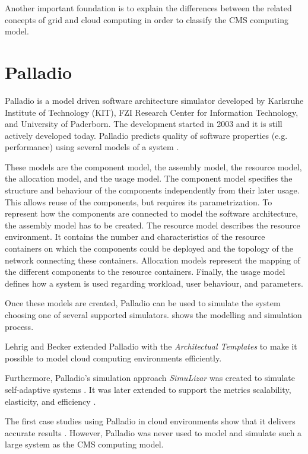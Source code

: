 Another important foundation is to explain the differences between the related concepts of grid and cloud computing in order to classify the CMS computing model.

\section{Palladio}
\label{palladio}
Palladio is a model driven software architecture simulator developed by Karlsruhe Institute of Technology (KIT), FZI Research Center for Information Technology, and University of Paderborn. The development started in 2003 and it is still actively developed today. Palladio predicts quality of software properties (e.g. performance) using several models of a system \cite{BECKER20093}.

These models are the component model, the assembly model, the resource model, the allocation model, and the usage model.
The component model specifies the structure and behaviour of the components independently from their later usage. This allows reuse of the components,  but requires its parametrization.
To represent how the components are connected to model the software architecture, the assembly model has to be created. 
The resource model describes the resource environment. It contains the number and characteristics of the resource containers on which the components could be deployed and the topology of the network connecting these containers.
Allocation models represent the mapping of the different components to the resource containers.
Finally, the usage model defines how a system is used regarding workload, user behaviour, and parameters.

Once these models are created, Palladio can be used to simulate the system choosing one of several supported simulators.  shows the modelling and simulation process. 

Lehrig and Becker \cite{arch} extended Palladio with the \textit{Architectual Templates} to make it possible to model cloud computing environments efficiently.

Furthermore, Palladio's simulation approach \textit{SimuLizar} was created to simulate self-adaptive systems \cite{becker2013simulizar}.
It was later extended to support the metrics scalability, elasticity, and efficiency \cite{arch}.

The first case studies using Palladio in cloud environments show that it delivers accurate results \cite{arch}. However, Palladio was never used to model and simulate such a large system as the CMS computing model.

